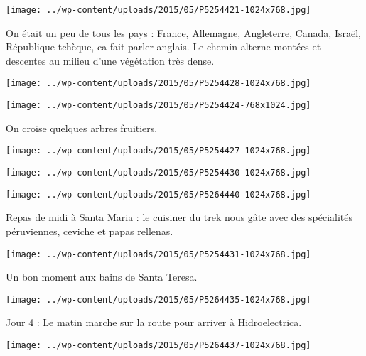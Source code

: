  \newline
\centerline{\texttt{[image: ../wp-content/uploads/2015/05/P5254421-1024x768.jpg]} } 
 \newline
 On était un peu de tous les pays : France, Allemagne, Angleterre, Canada, Israël, République tchèque, ca fait parler anglais. \newline
 Le chemin alterne montées et descentes au milieu d'une végétation très dense. \newline
 \newline
\centerline{\texttt{[image: ../wp-content/uploads/2015/05/P5254428-1024x768.jpg]} } 
 \newline
 \newline
\centerline{\texttt{[image: ../wp-content/uploads/2015/05/P5254424-768x1024.jpg]} } 
 \newline
 On croise quelques arbres fruitiers. \newline
 \newline
\centerline{\texttt{[image: ../wp-content/uploads/2015/05/P5254427-1024x768.jpg]} } 
 \newline
 \newline
\centerline{\texttt{[image: ../wp-content/uploads/2015/05/P5254430-1024x768.jpg]} } 
 \newline
 \newline
\centerline{\texttt{[image: ../wp-content/uploads/2015/05/P5264440-1024x768.jpg]} } 
 \newline
 Repas de midi à Santa Maria : le cuisiner du trek nous gâte avec des spécialités péruviennes, ceviche et papas rellenas. \newline
 \newline
\centerline{\texttt{[image: ../wp-content/uploads/2015/05/P5254431-1024x768.jpg]} } 
 \newline
 Un bon moment aux bains de Santa Teresa. \newline
 \newline
\centerline{\texttt{[image: ../wp-content/uploads/2015/05/P5264435-1024x768.jpg]} } 
 \newline
 Jour 4 : \newline
 Le matin marche sur la route pour arriver à Hidroelectrica. \newline
 \newline
\centerline{\texttt{[image: ../wp-content/uploads/2015/05/P5264437-1024x768.jpg]} } 
 \newline
